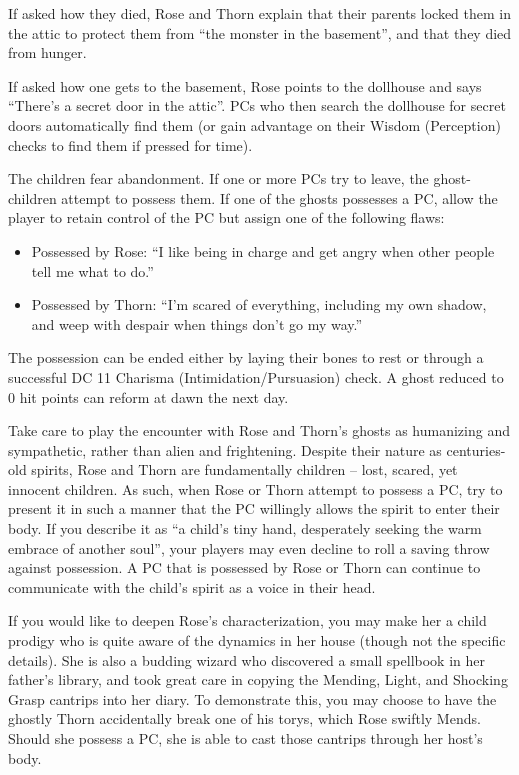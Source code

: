 If asked how they died, Rose and Thorn explain that their parents locked them in the attic to protect
them from ``the monster in the basement'', and that they died from hunger.

If asked how one gets to the basement, Rose points to the dollhouse and says ``There's a secret door in
the attic''. PCs who then search the dollhouse for secret doors automatically find them (or gain advantage
on their Wisdom (Perception) checks to find them if pressed for time).

The children fear abandonment. If one or more PCs try to leave, the ghost-children attempt to possess them.
If one of the ghosts possesses a PC, allow the player to retain control of the PC but assign one of the
following flaws:
\begin{itemize}
  \item Possessed by Rose: ``I like being in charge and get angry when other people tell me what to do.''
  \item Possessed by Thorn: ``I'm scared of everything, including my own shadow, and weep with despair when
  things don't go my way.''
\end{itemize}
The possession can be ended either by laying their bones to rest or through a successful DC 11 Charisma (Intimidation/Pursuasion) check. A ghost reduced to 0 hit points can reform at dawn the next day.

Take care to play the encounter with Rose and Thorn's ghosts as humanizing and sympathetic, rather than
alien and frightening. Despite their nature as centuries-old spirits, Rose and Thorn are fundamentally
children -- lost, scared, yet innocent children. As such, when Rose or Thorn attempt to possess a PC,
try to present it in such a manner that the PC willingly allows the spirit to enter their body. If you
describe it as ``a child's tiny hand, desperately seeking the warm embrace of another soul'', your players
may even decline to roll a saving throw against possession. A PC that is possessed by Rose or Thorn can
continue to communicate with the child's spirit as a voice in their head.

If you would like to deepen Rose's characterization, you may make her a child prodigy who is quite aware
of the dynamics in her house (though not the specific details). She is also a budding wizard who discovered
a small spellbook in her father's library, and took great care in copying the Mending, Light, and Shocking
Grasp cantrips into her diary. To demonstrate this, you may choose to have the ghostly Thorn accidentally
break one of his torys, which Rose swiftly Mends. Should she possess a PC, she is able to cast those cantrips
through her host's body.

